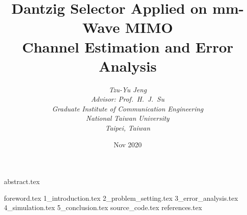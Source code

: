 \documentclass[a4paper, 12pt, twoside, openright]{mythesis}
\begin{document}
\title{
   \textbf {Dantzig Selector Applied on mm-Wave MIMO} \\ \bigskip
   \textbf {Channel Estimation and Error Analysis}
}


\author{
   {\it Tzu-Yu Jeng} \\ \bigskip
   {\it Advisor: Prof.\ H.\ J.\ Su} \\ \bigskip
   {\it Graduate Institute of Communication Engineering} \\ \bigskip
   {\it National Taiwan University} \\ \bigskip
   {\it Taipei, Taiwan}
}

{\date{Nov 2020}}

\maketitle

\frontmatter
 {abstract.tex}
\tableofcontents
\listoffigures
\listoftables


\mainmatter

 {foreword.tex}
 {1_introduction.tex}
 {2_problem_setting.tex}
 {3_error_analysis.tex}
 {4_simulation.tex}
 {5_conclusion.tex}
 {source_code.tex}
 {references.tex}
\end{document}
